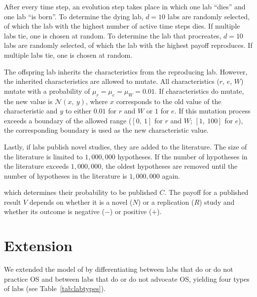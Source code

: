 \documentclass[meta, authordate]{jote-new-article}
\begin{document}
\begin{adjustwidth}{-4cm}{}
\begin{tcolorbox}
{      After every time step, an evolution step takes place in which one lab ``dies'' and one lab ``is born''. To determine the dying lab, $d=10$ labs are randomly selected, of which the lab with the highest number of active time steps dies. If multiple labs tie, one is chosen at random. To determine the lab that procreates, $d=10$ labs are randomly selected, of which the lab with the highest payoff reproduces. If multiple labs tie, one is chosen at random.

      The offspring lab inherits the characteristics from the reproducing lab. However, the inherited characteristics are allowed to mutate. All characteristics ($r$, $e$, $W$) mutate with a probability of $\mu_r=\mu_e=\mu_W=0.01$. If characteristics do mutate, the new value is $\mathcal{N}\left(x,~y\right)$, where $x$ corresponds to the old value of the characteristic and $y$ to either $0.01$ for $r$ and $W$ or $1$ for $e$. If this mutation process exceeds a boundary of the allowed range ($\left[0,~1\right]$ for $r$ and $W$; $\left[1,~100\right]$ for $e$), the corresponding boundary is used as the new characteristic value.

      Lastly, if labs publish novel studies, they are added to the literature. The size of the literature is limited to $1,000,000$ hypotheses. If  the number of hypotheses in the literature exceeds $1,000,000$, the oldest hypotheses are removed until the number of hypotheses in the literature is $1,000,000$ again.

    }
  \end{tcolorbox}
\end{adjustwidth}
%


\noindent which determines their probability to be published $C$. The payoff for a published result $V$ depends on whether it is a novel ($N$) or a replication ($R$) study and whether its outcome is negative ($-$) or positive ($+$).


\section{Extension}

We extended the model of \textcite{SmaldinoMcelreath2016} by differentiating between labs that do or do not practice OS and between labs that do or do not advocate OS, yielding four types of labs (see Table~\ref{tab:labtypes}).
%
\end{document}
